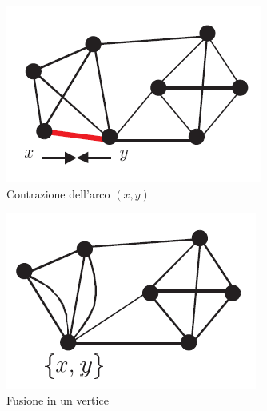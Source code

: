 \begin{figure}[h]
     \centering
     \begin{subfigure}[b]{0.3\textwidth}
             \centering
             \includegraphics[width=\textwidth]{./images/contract-original-graph.png}
             \caption{Contrazione dell'arco $(x, y)$}
             \label{fig:original-graph}
     \end{subfigure}
   	\hfill
     \begin{subfigure}[b]{0.3\textwidth}
             \centering
             \includegraphics[width=\textwidth]{./images/contract-xy.png}
             \caption{Fusione in un vertice}
             \label{fig:contract-xy}
     \end{subfigure}
    \hfill
     \begin{subfigure}[b]{0.3\textwidth}
             \centering

\end{subfigure}
\end{figure}
